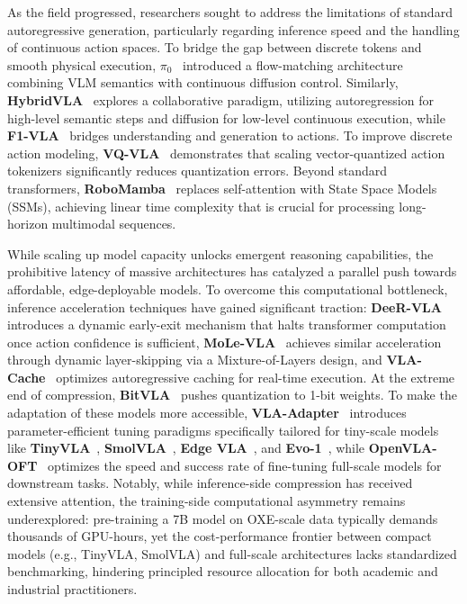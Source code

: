 \documentclass[acmsmall,screen,review,anonymous]{acmart}
\begin{document}
As the field progressed, researchers sought to address the limitations of standard autoregressive generation, particularly regarding inference speed and the handling of continuous action spaces. To bridge the gap between discrete tokens and smooth physical execution, \textbf{$\pi_0$}~\cite{black2024pi0} introduced a flow-matching architecture combining VLM semantics with continuous diffusion control. Similarly, \textbf{HybridVLA}~\cite{liu2025hybridvla} explores a collaborative paradigm, utilizing autoregression for high-level semantic steps and diffusion for low-level continuous execution, while \textbf{F1-VLA}~\cite{lv2025f1vla} bridges understanding and generation to actions. To improve discrete action modeling, \textbf{VQ-VLA}~\cite{wang2025vqvla} demonstrates that scaling vector-quantized action tokenizers significantly reduces quantization errors. Beyond standard transformers, \textbf{RoboMamba}~\cite{liu2024robomamba} replaces self-attention with State Space Models (SSMs), achieving linear time complexity that is crucial for processing long-horizon multimodal sequences. 

While scaling up model capacity unlocks emergent reasoning capabilities, the prohibitive latency of massive architectures has catalyzed a parallel push towards affordable, edge-deployable models. To overcome this computational bottleneck, inference acceleration techniques have gained significant traction: \textbf{DeeR-VLA}~\cite{yue2024deervla} introduces a dynamic early-exit mechanism that halts transformer computation once action confidence is sufficient, \textbf{MoLe-VLA}~\cite{zhang2025molevla} achieves similar acceleration through dynamic layer-skipping via a Mixture-of-Layers design, and \textbf{VLA-Cache}~\cite{xu2025vlacache} optimizes autoregressive caching for real-time execution. At the extreme end of compression, \textbf{BitVLA}~\cite{wang2025bitvla} pushes quantization to 1-bit weights. To make the adaptation of these models more accessible, \textbf{VLA-Adapter}~\cite{wang2025vlaadapter} introduces parameter-efficient tuning paradigms specifically tailored for tiny-scale models like \textbf{TinyVLA}~\cite{wen2025tinyvla}, \textbf{SmolVLA}~\cite{shukor2025smolvla}, \textbf{Edge VLA}~\cite{budzianowski2025edgevla}, and \textbf{Evo-1}~\cite{lin2025evo1}, while \textbf{OpenVLA-OFT}~\cite{kim2025openvlaoft} optimizes the speed and success rate of fine-tuning full-scale models for downstream tasks. Notably, while inference-side compression has received extensive attention, the training-side computational asymmetry remains underexplored: pre-training a 7B model on OXE-scale data typically demands thousands of GPU-hours, yet the cost-performance frontier between compact models (e.g., TinyVLA, SmolVLA) and full-scale architectures lacks standardized benchmarking, hindering principled resource allocation for both academic and industrial practitioners.
\end{document}
